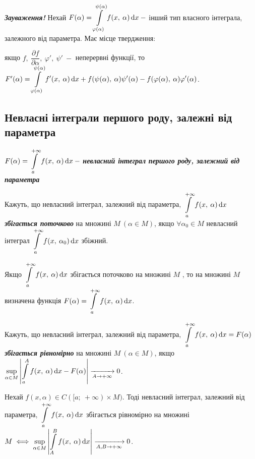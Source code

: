  \textcolor{NavyBlue}{\textbf{\textit{Зауваження! }}}Нехай $F(\alpha) = \displaystyle\int\limits_{\varphi(\alpha)}^{\psi(\alpha)} f(x, \: \alpha) \, \mathrm{d}x  \:  - $ інший тип власного інтеграла, залежного від параметра. Має місце твердження:


якщо $f, \: \dfrac{\partial f}{\partial \alpha}, \: \varphi ', \: \psi '\: - $ неперервні функції, то $F'(\alpha) = \displaystyle\int\limits_{\varphi(\alpha)}^{\psi(\alpha)} f'(x, \: \alpha) \, \mathrm{d}x + f(\psi(\alpha), \: \alpha) \psi'(\alpha) - f(\varphi(\alpha),\: \alpha)  \varphi'(\alpha) $.
\subsection{\large{Невласні інтеграли першого роду, залежні від параметра}}

$F(\alpha) = \displaystyle\int\limits_a^{+\infty} f(x, \: \alpha) \, \mathrm{d}x  \:  - $  \textcolor{NavyBlue}{\textbf{\textit{невласний інтеграл першого роду, залежний від параметра}}}

\begin{definition}
Кажуть, що невласний інтеграл, залежний від параметра, $ \displaystyle\int\limits_a^{+\infty} f(x, \: \alpha) \, \mathrm{d}x$ \textcolor{NavyBlue}{ \textbf{\textit{збігається поточково}}} на множині $M \ (\alpha \in M)$, якщо $\forall \alpha_0 \in M$ невласний інтеграл $ \displaystyle\int\limits_a^{+\infty} f(x, \: \alpha_0) \, \mathrm{d}x $ збіжний. 
\end{definition}

Якщо $ \displaystyle\int\limits_a^{+\infty} f(x, \: \alpha) \, \mathrm{d}x$  збігається поточково на множині $M$ , то на множині $M$ визначена функція $F(\alpha) = \displaystyle\int\limits_a^{+\infty} f(x, \: \alpha) \, \mathrm{d}x $.

\begin{definition}
Кажуть, що невласний інтеграл, залежний від параметра, $\displaystyle\int\limits_a^{+\infty} f(x, \: \alpha) \, \mathrm{d}x = F(\alpha) $  \textcolor{NavyBlue}{\textbf{\textit{збігається рівномірно}}} на множині $M \ ( \alpha \in M)$, якщо $\underset{\alpha \in M}{\sup} \left|  \displaystyle\int\limits_a^A f(x, \: \alpha) \, \mathrm{d}x - F(\alpha)\right| \xrightarrow[A \to +\infty]{} 0$.



\end{definition}

\begin{theorem} 
Нехай $f(x, \alpha) \in C([a; \: +\infty) \times M)$. Тоді невласний інтеграл, залежний від параметра, $\displaystyle\int\limits_a^{+\infty} f(x, \: \alpha) \, \mathrm{d}x$  збігається рівномірно на множині $M \iff \underset{\alpha \in M}{\sup} \left|  \displaystyle\int\limits_A^B f(x, \: \alpha) \, \mathrm{d}x\right| \xrightarrow[A, B \to +\infty]{} 0$.

\end{theorem} 


